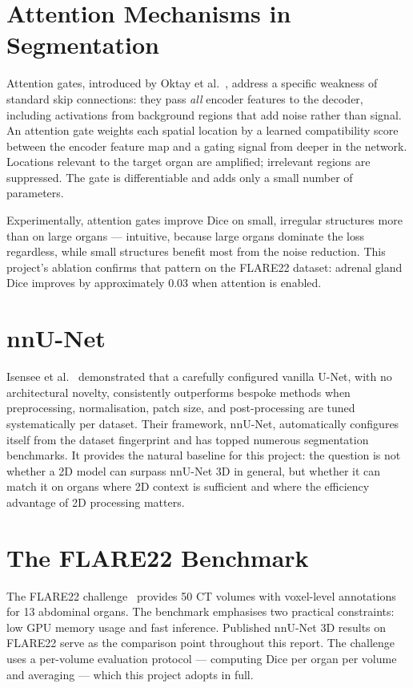 \section{Attention Mechanisms in Segmentation}

Attention gates, introduced by Oktay et al.~\cite{oktay2018}, address a specific weakness of
standard skip connections: they pass \emph{all} encoder features to the decoder, including
activations from background regions that add noise rather than signal. An attention gate weights
each spatial location by a learned compatibility score between the encoder feature map and a
gating signal from deeper in the network. Locations relevant to the target organ are amplified;
irrelevant regions are suppressed. The gate is differentiable and adds only a small number of
parameters.

Experimentally, attention gates improve Dice on small, irregular structures more than on large
organs --- intuitive, because large organs dominate the loss regardless, while small structures
benefit most from the noise reduction. This project's ablation confirms that pattern on the
FLARE22 dataset: adrenal gland Dice improves by approximately 0.03 when attention is enabled.

\section{nnU-Net}

Isensee et al.~\cite{isensee2021} demonstrated that a carefully configured vanilla U-Net,
with no architectural novelty, consistently outperforms bespoke methods when preprocessing,
normalisation, patch size, and post-processing are tuned systematically per dataset. Their
framework, nnU-Net, automatically configures itself from the dataset fingerprint and has topped
numerous segmentation benchmarks. It provides the natural baseline for this project: the
question is not whether a 2D model can surpass nnU-Net 3D in general, but whether it can match
it on organs where 2D context is sufficient and where the efficiency advantage of 2D processing
matters.

\section{The FLARE22 Benchmark}

The FLARE22 challenge~\cite{flare22} provides 50 CT volumes with voxel-level annotations for
13 abdominal organs. The benchmark emphasises two practical constraints: low GPU memory usage
and fast inference. Published nnU-Net 3D results on FLARE22 serve as the comparison point
throughout this report. The challenge uses a per-volume evaluation protocol --- computing Dice
per organ per volume and averaging --- which this project adopts in full.

